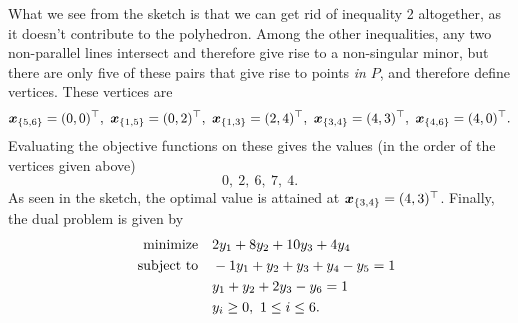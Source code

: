 \documentclass{article}
\begin{document}
\begin{figure}[h!]
\centering
{}
\end{figure}

What we see from the sketch is that we can get rid of inequality 2 altogether, as it doesn't contribute to the polyhedron. Among the other inequalities, any two non-parallel lines intersect and therefore give rise to a non-singular minor, but there are only
five of these pairs that give rise to points {\em in} $P$, and therefore define vertices. These vertices are
\begin{equation*}
 \vct{x}_{\{5,6\}}=(0,0)^{\trans}, \ \vct{x}_{\{1,5\}} = (0,2)^{\trans}, \  \vct{x}_{\{1,3\}} = (2,4)^{\trans}, \ \vct{x}_{\{3,4\}} = (4,3)^{\trans}, \ \vct{x}_{\{4,6\}} = (4,0)^{\trans}.
\end{equation*}
Evaluating the objective functions on these gives the values (in the order of the vertices given above)
\begin{equation*}
 0, \ 2, \ 6, \ 7, \ 4.
\end{equation*}
As seen in the sketch, the optimal value is attained at $\bm{x}_{\{3,4\}}=(4,3)^{\top}$.
Finally, the dual problem is given by
\begin{align*}
 \text{minimize}\quad & 2y_1+8y_2+10y_3+4y_4\\
 \quad\text{subject to}\quad & -1y_1+y_2+y_3+y_4-y_5=1\\
 & y_1+y_2+2y_3-y_6=1\\
 & y_i\geq 0, \ 1\leq i\leq 6.
\end{align*}
\end{document}
